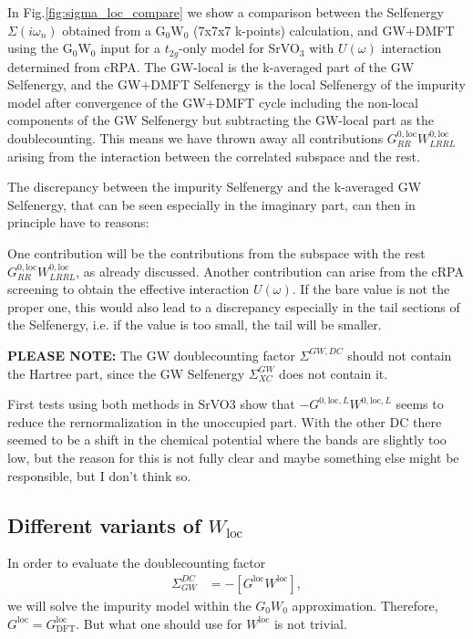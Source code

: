 \documentclass[12pt,a4paper]{scrartcl}
\numberwithin{equation}{section}
\begin{document}
In Fig.\ref{fig:sigma_loc_compare} we show a comparison between the Selfenergy 
$\Sigma(i\omega_n)$ obtained from a G$_0$W$_0$ (7x7x7 k-points) calculation,
and GW+DMFT using the G$_0$W$_0$ input for a $t_{2g}$-only model for SrVO$_3$ with $U(\omega)$ interaction determined from cRPA.
The GW-local is the k-averaged part of the GW Selfenergy, and the GW+DMFT Selfenergy
is the local Selfenergy of the impurity model
after convergence of the GW+DMFT cycle including the non-local components
of the GW Selfenergy but subtracting the GW-local part as the doublecounting.
This means we have thrown away all contributions $G^{0,\mathrm{loc}}_{RR}W^{0,\mathrm{loc}}_{LRRL}$
arising from the interaction between the correlated subspace and the rest.

The discrepancy between the impurity Selfenergy and the k-averaged
GW Selfenergy, that can be seen especially in the imaginary part,
can then in principle have to reasons:

One contribution will be the contributions from the subspace
with the rest $G^{0,\mathrm{loc}}_{RR}W^{0,\mathrm{loc}}_{LRRL}$, as already discussed.
Another contribution can arise from the cRPA screening to obtain the effective
interaction $U(\omega)$. If the bare value is not the proper one, this would also
lead to a discrepancy especially in the tail sections of the Selfenergy, i.e.
if the value is too small, the tail will be smaller. 

\textbf{PLEASE NOTE:}
The GW doublecounting factor $\Sigma^{GW,DC}$ should not contain the Hartree
part, since the GW Selfenergy $\Sigma^{GW}_{XC}$ does not contain it.

First tests using both methods in SrVO3 show that $-G^{0,\mathrm{loc},L}W^{0,\mathrm{loc},L}$
seems to reduce the rernormalization in the unoccupied part.
With the other DC there seemed to be a shift in the chemical potential where
the bands are slightly too low, but the reason for this is not fully clear and
maybe something else might be responsible, but I don't think so.


\subsection{Different variants of $W_{\mathrm{loc}}$}
In order to evaluate the doublecounting factor
\begin{align}
\Sigma^{DC}_{GW} &= -[G^{\mathrm{loc}}W^{\mathrm{loc}}],
\end{align}
we will solve the impurity model within the $G_0W_0$ approximation.
Therefore, $G^{\mathrm{loc}}=G^{\mathrm{loc}}_{\mathrm{DFT}}$.
But what one should use for $W^{\mathrm{loc}}$ is not trivial.
\end{document}
